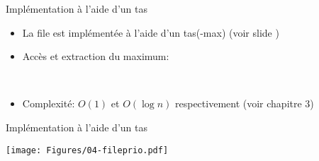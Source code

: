\begin{frame}{Implémentation à l'aide d'un tas}
\begin{itemize}
\item La file est implémentée à l'aide d'un tas(-max) (voir slide \pageref{sec:03tas})
\item Accès et extraction du maximum:

\bigskip

\begin{center}
\begin{small}
~~~~~
\end{small}
\end{center}

\bigskip

\item Complexité: $O(1)$ et $O(\log n)$ respectivement (voir chapitre 3)
\end{itemize}

\end{frame}

\begin{frame}{Implémentation à l'aide d'un tas}

\begin{center}
\texttt{[image: Figures/04-fileprio.pdf]}
\end{center}

\end{frame}

